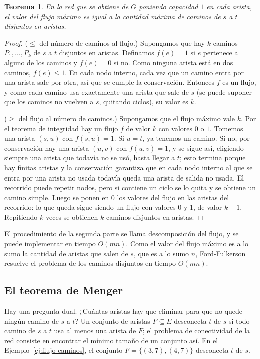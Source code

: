 \documentclass[12pt, spanish, oneside, openany]{book}
\theoremstyle{uprightplain}
\newtheorem{teorema}{Teorema}[section]
\theoremstyle{definition}
\theoremstyle{remark}
\theoremstyle{definition}
\begin{document}
\begin{teorema}
\label{teo:flujo-caminos-flujo}
En la red que se obtiene de $G$ poniendo capacidad $1$ en cada arista, el valor del flujo máximo es igual a la cantidad máxima de caminos de $s$ a $t$ disjuntos en aristas.
\end{teorema}
\begin{proof}
($\le$ del número de caminos al flujo.) Supongamos que hay $k$ caminos $P_1,\dots,P_k$ de $s$ a $t$ disjuntos en aristas. Definamos $f(e)=1$ si $e$ pertenece a alguno de los caminos y $f(e)=0$ si no. Como ninguna arista está en dos caminos, $f(e)\le 1$. En cada nodo interno, cada vez que un camino entra por una arista sale por otra, así que se cumple la conservación. Entonces $f$ es un flujo, y como cada camino usa exactamente una arista que sale de $s$ (se puede suponer que los caminos no vuelven a $s$, quitando ciclos), su valor es $k$.

($\ge$ del flujo al número de caminos.) Supongamos que el flujo máximo vale $k$. Por el teorema de integridad hay un flujo $f$ de valor $k$ con valores $0$ o $1$. Tomemos una arista $(s,u)$ con $f(s,u)=1$. Si $u=t$, ya tenemos un camino. Si no, por conservación hay una arista $(u,v)$ con $f(u,v)=1$, y se sigue así, eligiendo siempre una arista que todavía no se usó, hasta llegar a $t$; esto termina porque hay finitas aristas y la conservación garantiza que en cada nodo interno al que se entra por una arista no usada todavía queda una arista de salida no usada. El recorrido puede repetir nodos, pero si contiene un ciclo se lo quita y se obtiene un camino simple. Luego se ponen en $0$ los valores del flujo en las aristas del recorrido: lo que queda sigue siendo un flujo con valores $0$ y $1$, de valor $k-1$. Repitiendo $k$ veces se obtienen $k$ caminos disjuntos en aristas.
\end{proof}

El procedimiento de la segunda parte se llama descomposición del flujo, y se puede implementar en tiempo $O(mn)$. Como el valor del flujo máximo es a lo sumo la cantidad de aristas que salen de $s$, que es a lo sumo $n$, Ford-Fulkerson resuelve el problema de los caminos disjuntos en tiempo $O(mn)$.

\subsection{El teorema de Menger}

Hay una pregunta dual. ¿Cuántas aristas hay que eliminar para que no quede ningún camino de $s$ a $t$? Un conjunto de aristas $F\subseteq E$ desconecta $t$ de $s$ si todo camino de $s$ a $t$ usa al menos una arista de $F$; el problema de conectividad de la red consiste en encontrar el mínimo tamaño de un conjunto así. En el Ejemplo~\ref{ej:flujo-caminos}, el conjunto $F=\{(3,7),(4,7)\}$ desconecta $t$ de $s$.
\end{document}
